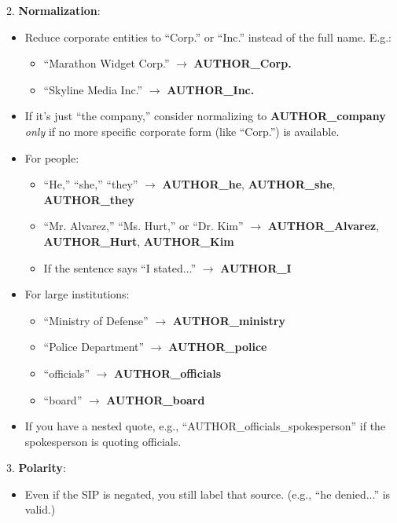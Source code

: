 \begin{figure*}[!ht]
\begin{tcolorbox}[
    width=\textwidth,
    colback=white,
    colframe=black,
    arc=4mm,
    boxrule=0.5pt,
    left=2mm,
    right=2mm,
    top=2mm,
    bottom=2mm,
    fonttitle=\bfseries,
    ]
\begin{tcolorbox}[
    colback=Periwinkle!20,
    boxrule=0pt,
    colframe=white,
    left=0pt,
    right=0pt,
    top=0pt,
    bottom=0pt,
    ]
2. \textbf{Normalization}:
   \begin{itemize}[noitemsep, leftmargin=15pt]
      \item Reduce corporate entities to ``Corp.'' or ``Inc.'' instead of the full name. E.g.:
         \begin{itemize}[noitemsep, leftmargin=15pt]
            \item ``Marathon Widget Corp.'' $\rightarrow$ \textbf{AUTHOR\_Corp.}
            \item ``Skyline Media Inc.'' $\rightarrow$ \textbf{AUTHOR\_Inc.}
         \end{itemize}
      \item If it's just ``the company,'' consider normalizing to \textbf{AUTHOR\_company} \textit{only} if no more specific corporate form (like ``Corp.'') is available.
      \item For people:
         \begin{itemize}[noitemsep, leftmargin=15pt]
            \item ``He,'' ``she,'' ``they'' $\rightarrow$ \textbf{AUTHOR\_he}, \textbf{AUTHOR\_she}, \textbf{AUTHOR\_they}
            \item ``Mr. Alvarez,'' ``Ms. Hurt,'' or ``Dr. Kim'' $\rightarrow$ \textbf{AUTHOR\_Alvarez}, \textbf{AUTHOR\_Hurt}, \textbf{AUTHOR\_Kim}
            \item If the sentence says ``I stated...'' $\rightarrow$ \textbf{AUTHOR\_I}
         \end{itemize}
      \item For large institutions:
         \begin{itemize}[noitemsep, leftmargin=15pt]
            \item ``Ministry of Defense'' $\rightarrow$ \textbf{AUTHOR\_ministry}
            \item ``Police Department'' $\rightarrow$ \textbf{AUTHOR\_police}
            \item ``officials'' $\rightarrow$ \textbf{AUTHOR\_officials}
            \item ``board'' $\rightarrow$ \textbf{AUTHOR\_board}
         \end{itemize}
      \item If you have a nested quote, e.g., ``AUTHOR\_officials\_spokesperson'' if the spokesperson is quoting officials.
   \end{itemize}

3. \textbf{Polarity}:
   \begin{itemize}[noitemsep, leftmargin=15pt]
      \item Even if the SIP is negated, you still label that source. (e.g., ``he denied...'' is valid.)
   \end{itemize}


\end{tcolorbox}
\end{tcolorbox}
\end{figure*}
